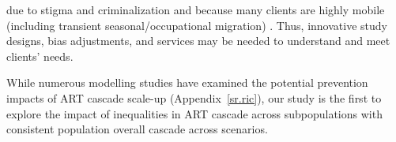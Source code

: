 due to stigma and criminalization \cite{Behanzin2013} and
because many clients are highly mobile
(including transient seasonal/occupational migration) \cite{Camlin2019}.
Thus, innovative study designs, bias adjustments, and services may be needed
to understand and meet clients' needs.
\par
While numerous modelling studies have examined
the potential prevention impacts of ART cascade scale-up
\cite{Knight2022sr} (Appendix~\ref{sr.ric}),
our study is the first to explore the impact of
inequalities in ART cascade across subpopulations
with consistent population overall cascade across scenarios.
